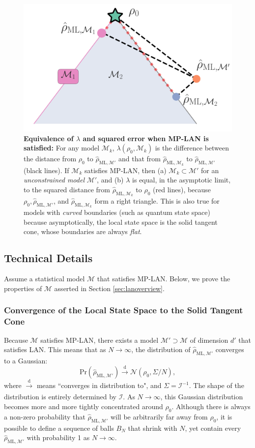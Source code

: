 \documentclass[aps,pra, twocolumn]{revtex4-1}
\newcommand{\M}{\mathcal{M}}
\newcommand{\rhohat}{\hat{\rho}}
\newcommand{\rhoML}[1]{\rhohat_{\scriptscriptstyle{\mathrm{ML},#1}}}
\begin{document}
\begin{figure}
\includegraphics[width=.75\columnwidth]{Images/Figure_3.pdf}
 \caption{\textbf{Equivalence of $\lambda$ and squared error when MP-LAN is satisfied:} For any model $\M_{k}$, $\lambda(\rho_{0}, \M_{k})$ is the difference between the distance from $\rho_{0}$ to $\rhoML{\M'}$ and that from $\rhoML{\M_{k}}$ to $\rhoML{\M'}$ (black lines). If $\M_{k}$ satisfies MP-LAN, then (a) $\M_{k} \subset \M'$ for an \emph{unconstrained model} $\M'$, and (b) $\lambda$ is equal, in the asymptotic limit, to the squared distance from $\rhoML{\M_{k}}$ to $\rho_{0}$ (red lines), because $\rho_{0}, \rhoML{\M'}$, and $\rhoML{\M_{k}}$ form a right triangle. This is also true for models with \emph{curved} boundaries (such as quantum state space) because asymptotically, the local state space is the solid tangent cone, whose boundaries are always \emph{flat}.}
\label{fig:llrs_MP-LAN}
\end{figure}

\subsection{Technical Details}

Assume a statistical model $\M$ that satisfies MP-LAN. Below, we prove the properties of $\M$ asserted in Section \ref{sec:lanoverview}. 

\subsubsection{Convergence of the Local State Space to the Solid Tangent Cone}

Because $\M$ satisfies MP-LAN, there exists a model $\M' \supset \M$ of dimension $d'$ that satisfies LAN. This means that as $N \rightarrow \infty$, the distribution of $\rhoML{\M'}$ converges to a Gaussian:
\[\mathrm{Pr}(\rhoML{\M'})\xrightarrow[]{\text{d}} \mathcal{N}(\rho_{0}, \Sigma/N),\]
where $\xrightarrow[]{\text{d}}$ means ``converges in distribution to", and $\Sigma = \mathcal{I}^{-1}$.
The shape of the distribution is entirely determined by $\mathcal{I}$. As $N \rightarrow \infty$, this Gaussian distribution becomes more and more tightly concentrated around $\rho_{0}$. Although there is always a non-zero probability that $\rhoML{\M'}$ will be arbitrarily far away from $\rho_{0}$, it is possible to define a sequence of balls $B_{N}$ that shrink with $N$, yet contain every $\rhoML{\M'}$ with probability 1 as $N \rightarrow \infty$.
\end{document}

